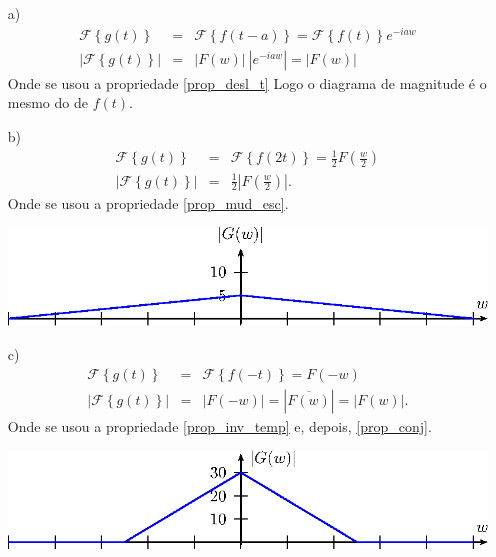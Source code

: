     \begin{resp}
    \begin{itemize}
    \item[a)]
     \begin{eqnarray*}
    \mathcal{F}\left\{g(t)\right\}&=&\mathcal{F}\left\{f(t-a)\right\}=\mathcal{F}\left\{f(t)\right\}e^{-iaw}\\
    \left|\mathcal{F}\left\{g(t)\right\}\right|&=&|F(w)|~|e^{-iaw}|=|F(w)|
    \end{eqnarray*}
    Onde se usou a propriedade \ref{prop_desl_t}
    Logo o diagrama de magnitude é o mesmo do de $f(t)$.
    \item[b)] 
     \begin{eqnarray*}
    \mathcal{F}\left\{g(t)\right\}&=&\mathcal{F}\left\{f(2t)\right\}=\frac{1}{2}F\left(\frac{w}{2}\right)\\
    \left|\mathcal{F}\left\{g(t)\right\}\right|&=&\frac{1}{2}\left|F\left(\frac{w}{2}\right)\right|.
    \end{eqnarray*}
    Onde se usou a propriedade \ref{prop_mud_esc}.
    \begin{center}
    \includegraphics{cap_propriedades_transformada/pics/figura_14}\end{center}
    \item[c)] 
     \begin{eqnarray*}
    \mathcal{F}\left\{g(t)\right\}&=&\mathcal{F}\left\{f(-t)\right\}=F\left(-w\right)\\
    \left|\mathcal{F}\left\{g(t)\right\}\right|&=&\left|F\left(-w\right)\right|=\left|\overline{F\left(w\right)}\right|=\left|F\left(w\right)\right|.
    \end{eqnarray*}
    Onde se usou a propriedade \ref{prop_inv_temp} e, depois, \ref{prop_conj}.
    \begin{center}
    \includegraphics{cap_propriedades_transformada/pics/figura_15}\end{center}

\end{itemize}
\end{resp}
